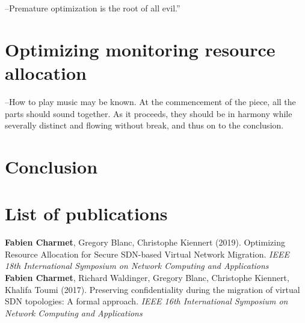 \documentclass[a4paper, 11pt]{report}
\newcommand{\boxedtext}[1]{\fbox{\scriptsize\bfseries\textsf{#1}}}
\newcommand{\myremark}[2]{
   \textcolor{blue}{\boxedtext{#1}
      {\small$\blacktriangleright$\emph{\textsl{#2}}$\blacktriangleleft$}
}}
\newcommand\FC[1]{\myremark{FC}{#1}}
\theoremstyle{definition}
\begin{document}
\newpage
\begin{savequote}
--Premature optimization is the root of all evil.”
\end{savequote}
\chapter{Optimizing monitoring resource allocation}
\label{sec:RAprob}




\newpage


\newpage
\begin{savequote}
--How to play music may be known. At the commencement of the piece, all the parts should sound together. As it proceeds, they should be in harmony while severally distinct and flowing without break, and thus on to the conclusion.
\end{savequote}
\chapter{Conclusion}


\newpage
\chapter*{List of publications}
\textbf{Fabien Charmet}, Gregory Blanc, Christophe Kiennert (2019). Optimizing Resource Allocation for Secure SDN-based Virtual Network Migration. \textit{IEEE 18th International Symposium on Network Computing and Applications}\\

\textbf{Fabien Charmet}, Richard Waldinger, Gregory Blanc, Christophe Kiennert, Khalifa Toumi (2017). Preserving confidentiality during the migration of virtual SDN topologies: A formal approach. \textit{IEEE 16th International Symposium on Network Computing and Applications}

\newpage


\newpage
{}




% 
% 
\end{document}
